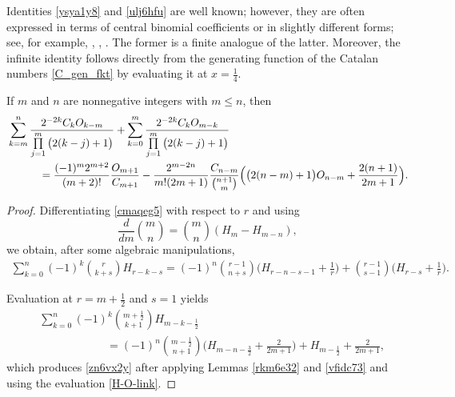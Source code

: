 \documentclass[12pt,reqno]{article}
\begin{document}
\begin{remark} 
Identities \eqref{ysya1y8} and \eqref{ulj6hfu} are well known; however, they are often expressed in terms of central binomial coefficients or in slightly different forms; see, for example, \cite[p.~11]{Cao}, \cite[p.~311]{Lang}, \cite[Theorem 22]{Qi-Guo}. The former is a finite analogue of the latter. Moreover, the infinite identity follows directly from the generating function of the Catalan numbers \eqref{C_gen_fkt} by evaluating it at $x=\frac14$.
\end{remark}
\begin{proposition}
If $m$ and $n$ are nonnegative integers with $m\leq n$, then
\begin{align}
&\sum_{k = m}^n \frac{2^{-2k}C_k O_{k - m} }{\prod\limits_{j = 1}^m \big(2(k - j) + 1\big)}  + \sum_{k = 0}^m \frac{2^{-2k}C_k O_{m - k} }{\prod\limits_{j = 1}^m \big(2(k - j) + 1\big)} \notag\\
&\qquad\quad  =  \frac{{(-1)^m 2^{m+2}} }{( {m + 2} )!}\frac{O_{m + 1} }{C_{m + 1} } - \frac{2^{m-2n} }{m!(2m+1)}\frac{C_{n-m}}{\binom{n+1}{m}}\Big(\big(2(n-m)+1\big)O_{n-m}+\frac{2(n+1)}{2m + 1}\Big) .\label{zn6vx2y}
\end{align}
\end{proposition}
\begin{proof}
Differentiating \eqref{cmaqeg5} with respect to $r$ and using
\begin{equation}\label{Dif_up}
\frac{d}{d m}\binom{m}{n} = \binom{m}{n}(H_m-H_{m-n}),
\end{equation}
we obtain, after some algebraic manipulations,
\begin{align*}
\sum_{k = 0}^n (- 1)^k \binom{r}{k + s}H_{r - k - s} = (- 1)^n \binom{r-1}{n+s}\Big(H_{r-n-s-1}+\frac{1}{r} \Big) 
+ \binom{r-1}{s-1}\Big(H_{r - s} + \frac{1}{r} \Big).
\end{align*}

Evaluation at $r=m+\frac12$ and $s=1$ yields
\begin{align*}
&\sum_{k = 0}^n {( - 1)^k \binom{m + \frac12}{k + 1}H_{m - k - \frac12} }\\ 
&\qquad\qquad\qquad= ( - 1)^{n} \binom{m - \frac12}{n + 1} \Big( H_{m-n-\frac32} +\frac{2}{2m+1}\Big) + H_{m - \frac12}+\frac{2}{2m+1},
\end{align*}
which produces \eqref{zn6vx2y} after applying Lemmas \ref{rkm6e32} and \ref{vfidc73} and using the evaluation \eqref{H-O-link}.
\end{proof}
\end{document}
